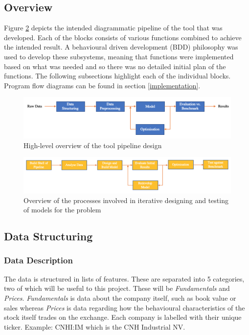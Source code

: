 \documentclass[10pt,onecolumn,letterpaper]{article}
\begin{document}
\subsection{Overview}

Figure \ref{pipeline_design} depicts the intended diagrammatic pipeline of the tool that was developed. Each of the blocks consists of various functions combined to achieve the intended result. A behavioural driven development (BDD) philosophy was used to develop these subsystems, meaning that functions were implemented based on what was needed and so there was no detailed initial plan of the functions. The following subsections highlight each of the individual blocks. Program flow diagrams can be found in section \ref{implementation}.

\begin{figure}[!hbt!]
\centering
\includegraphics[width=14.5cm]{design_pipeline.png}
\caption{High-level overview of the tool pipeline design}
\label{pipeline_design}
\end{figure}

\begin{figure}[!hbt!]
\centering
\includegraphics[width=14.5cm]{process_overview.png}
\caption{Overview of the processes involved in iterative designing and testing of models for the problem}
\label{pipeline_design}
\end{figure}

\subsection{Data Structuring}

\subsubsection{Data Description} \label{data_description}

The data is structured in lists of features. These are separated into 5 categories, two of which will be useful to this project. These will be \textit{Fundamentals} and \textit{Prices}. \textit{Fundamentals} is data about the company itself, such as book value or sales whereas \textit{Prices} is data regarding how the behavioural characteristics of the stock itself trades on the exchange. Each company is labelled with their unique ticker. Example: CNHI:IM which is the CNH Industrial NV. 
\end{document}
